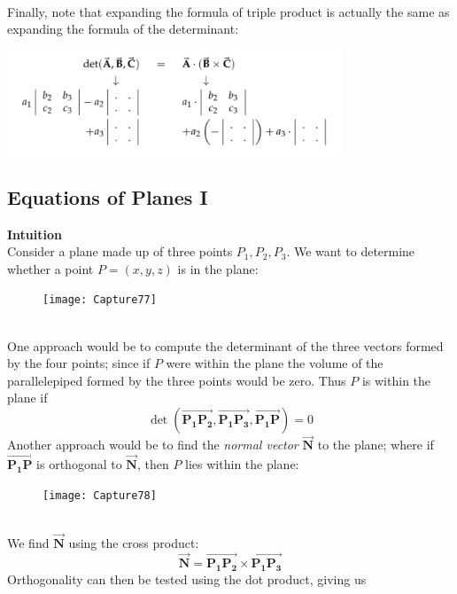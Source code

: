 \documentclass{report}
\begin{document}
\vspace{1mm}\\
Finally, note that expanding the formula of triple product is actually the same as expanding the formula of the determinant:
\begin{center}
\includegraphics[width=10cm]{105}
\end{center}
\newpage

\subsection{Equations of Planes I} %
\textbf{Intuition}\\
Consider a plane made up of three points $P_1,P_2,P_3$. 
We want to determine whether a point $P=(x,y,z)$ is in the plane:
\begin{figure}[h]
\texttt{[image: Capture77]}\\
\centering
\end{figure}\\
One approach would be to compute the determinant of the three vectors formed by the four points;
since if $P$ were within the plane the volume of the parallelepiped formed by the
three points would be zero. Thus $P$ is within the plane if
\begin{equation*}
\det(\overrightarrow{\mathbf{P_1P_2}},\overrightarrow{\mathbf{P_1P_3}},\overrightarrow{\mathbf{P_1P}})=0
\end{equation*}
Another approach would be to find the \textit{normal vector} $\overrightarrow{\mathbf{N}}$ to the plane; 
where if $\overrightarrow{\mathbf{P_1P}}$ is orthogonal to $\overrightarrow{\mathbf{N}}$, then 
$P$ lies within the plane: 
\begin{figure}[h]
\texttt{[image: Capture78]}\\
\centering
\end{figure}\\
We find $\overrightarrow{\mathbf{N}}$ using the cross product:
\begin{equation*}
\overrightarrow{\mathbf{N}}=\overrightarrow{\mathbf{P_1P_2}}\times\overrightarrow{\mathbf{P_1P_3}}
\end{equation*}
Orthogonality can then be tested using the dot product, giving us
\end{document}
